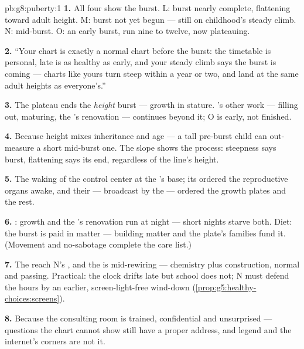 \begin{solution}{pb:g8:puberty:1}
\textbf{1.} All four show the  burst. L: burst
nearly complete, flattening toward adult height. M: burst
not yet begun --- still on childhood's steady climb. N:
mid-burst. O: an early burst, run nine to twelve, now
plateauing.

\textbf{2.} ``Your chart is exactly a normal chart before
the burst: the timetable is personal, late is as healthy
as early, and your steady climb says the burst is coming
--- charts like yours turn steep within a year or two,
and land at the same adult heights as everyone's.''

\textbf{3.} The plateau ends the \emph{height} burst ---
growth in stature. 's other work --- filling out,
maturing, the 's renovation --- continues beyond it;
O is early, not finished.

\textbf{4.} Because height mixes inheritance and age ---
a tall pre-burst child can out-measure a short mid-burst
one. The slope shows the process: steepness says burst,
flattening says its end, regardless of the line's height.

\textbf{5.} The waking of the control center at the
's base; its  ordered the reproductive
organs awake, and their  --- broadcast by the
 --- ordered the growth plates and the rest.

\textbf{6.} : growth and the 's renovation run
at night --- short nights starve both. Diet: the burst
is paid in matter --- building matter and the plate's
families fund it. (Movement and no-sabotage complete the
care list.)

\textbf{7.} The  reach N's , and the 
is mid-rewiring --- chemistry plus construction, normal
and passing. Practical: the clock drifts late but school
does not; N must defend the hours by an earlier,
screen-light-free wind-down
(\cref{prop:g5:healthy-choices:screens}).

\textbf{8.} Because the consulting room is trained,
confidential and unsurprised --- questions the chart
cannot show still have a proper address, and legend and
the internet's corners are not it.


\end{solution}
